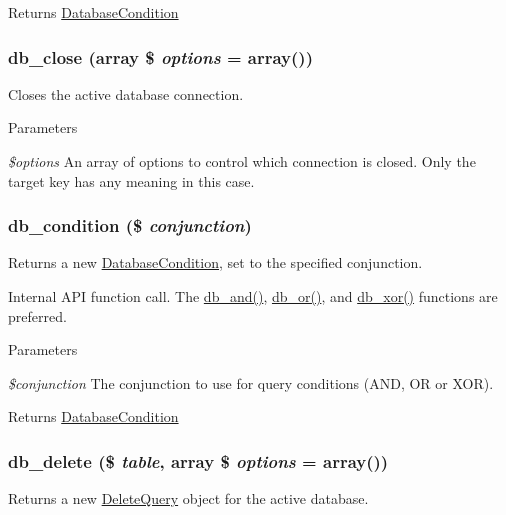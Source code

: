 \begin{DoxyReturn}{Returns}
\hyperlink{classDatabaseCondition}{DatabaseCondition} 
\end{DoxyReturn}
\hypertarget{group__database_ga3ee89e12a6f70888bfe4ac30f89df442}{
\subsubsection[{db\_\-close}]{\setlength{\rightskip}{0pt plus 5cm}db\_\-close (array \$ {\em options} = {\ttfamily array()})}}
\label{group__database_ga3ee89e12a6f70888bfe4ac30f89df442}
Closes the active database connection.


\begin{DoxyParams}{Parameters}
\item[{\em \$options}]An array of options to control which connection is closed. Only the target key has any meaning in this case. \end{DoxyParams}
\hypertarget{group__database_ga7e591c732d1eb7da6813ef79867a9859}{
\subsubsection[{db\_\-condition}]{\setlength{\rightskip}{0pt plus 5cm}db\_\-condition (\$ {\em conjunction})}}
\label{group__database_ga7e591c732d1eb7da6813ef79867a9859}
Returns a new \hyperlink{classDatabaseCondition}{DatabaseCondition}, set to the specified conjunction.

Internal API function call. The \hyperlink{group__database_ga39ab6e9c3b5316eb4d8fe8f52af91acc}{db\_\-and()}, \hyperlink{group__database_ga1a7695a360b8c2219fe1998dfc272080}{db\_\-or()}, and \hyperlink{group__database_ga85bb17ee005f930dd2caa93f0752d0e8}{db\_\-xor()} functions are preferred.


\begin{DoxyParams}{Parameters}
\item[{\em \$conjunction}]The conjunction to use for query conditions (AND, OR or XOR). \end{DoxyParams}
\begin{DoxyReturn}{Returns}
\hyperlink{classDatabaseCondition}{DatabaseCondition} 
\end{DoxyReturn}
\hypertarget{group__database_ga72f0ccecc0ba181de16c6e3451150f2c}{
\subsubsection[{db\_\-delete}]{\setlength{\rightskip}{0pt plus 5cm}db\_\-delete (\$ {\em table}, \/  array \$ {\em options} = {\ttfamily array()})}}
\label{group__database_ga72f0ccecc0ba181de16c6e3451150f2c}
Returns a new \hyperlink{classDeleteQuery}{DeleteQuery} object for the active database.


